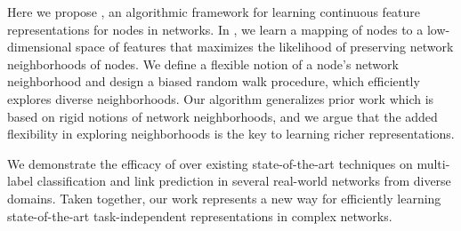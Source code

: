 Here we propose \nodevec, an algorithmic framework for learning continuous feature representations for nodes in networks. In \nodevec, we learn a mapping of nodes to a low-dimensional space of features that maximizes the likelihood of preserving network neighborhoods of nodes.
%
We define a flexible notion of a node's network neighborhood and design a biased random walk procedure, which efficiently explores diverse neighborhoods.
%
%
Our algorithm generalizes prior work which is based on rigid notions of network neighborhoods, and we argue that the added flexibility in exploring neighborhoods is the key to learning richer representations.

We demonstrate the efficacy of \nodevec over existing state-of-the-art techniques on multi-label classification and link prediction in several real-world networks from diverse domains.
%
Taken together, our work represents a new way for efficiently learning state-of-the-art task-independent representations in complex networks. %
